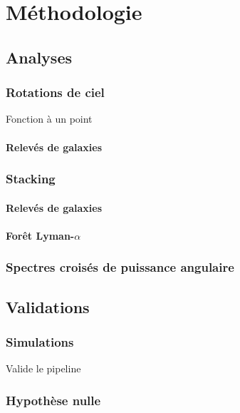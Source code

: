 
\chapter{Méthodologie} %

\label{Chapter7} %



\section{Analyses}
\subsection{Rotations de ciel}
Fonction à un point
\subsubsection{Relevés de galaxies}
\subsection{Stacking}
\subsubsection{Relevés de galaxies}
\subsubsection{Forêt Lyman-$\alpha$}
\subsection{Spectres croisés de puissance angulaire}

\section{Validations}
\subsection{Simulations}
Valide le pipeline
\subsection{Hypothèse nulle}
